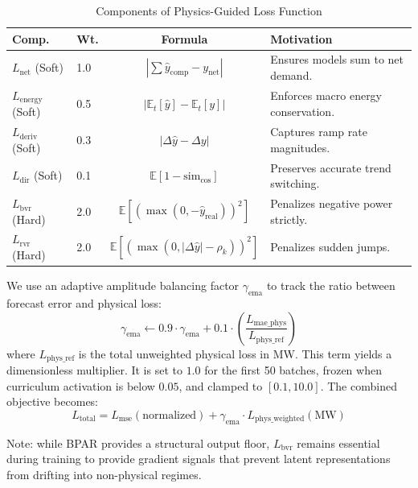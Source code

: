 \begin{table}[htbp]
\caption{Components of Physics-Guided Loss Function}
\label{tab:losses}
\centering
\footnotesize
\setlength{\tabcolsep}{3pt}
\begin{tabularx}{\columnwidth}{@{}llc>{\raggedright\arraybackslash}X@{}}
\toprule
\textbf{Comp.} & \textbf{Wt.} & \textbf{Formula} & \textbf{Motivation} \\ \midrule
$L_{\text{net}}$ (Soft) & 1.0 & $|\sum \hat{y}_{\text{comp}} - y_{\text{net}}|$ & Ensures models sum to net demand. \\
$L_{\text{energy}}$ (Soft) & 0.5 & $|\mathbb{E}_t[\hat{y}] - \mathbb{E}_t[y]|$ & Enforces macro energy conservation. \\
$L_{\text{deriv}}$ (Soft) & 0.3 & $|\Delta \hat{y} - \Delta y|$ & Captures ramp rate magnitudes. \\
$L_{\text{dir}}$ (Soft) & 0.1 & $\mathbb{E} [1 {-} \text{sim}_{\text{cos}}]$ & Preserves accurate trend switching. \\ \midrule
$L_{\text{bvr}}$ (Hard) & 2.0 & $\mathbb{E} [(\max(0, -\hat{y}_{\text{real}}))^2]$ & Penalizes negative power strictly. \\
$L_{\text{rvr}}$ (Hard) & 2.0 & $\mathbb{E} [(\max(0, |\Delta\hat{y}| {-} \rho_k))^2]$ & Penalizes sudden jumps. \\ \bottomrule
\end{tabularx}
\end{table}

We use an adaptive amplitude balancing factor $\gamma_{\text{ema}}$ to track the ratio between forecast error and physical loss:
\begin{equation}
    \gamma_{\text{ema}} \leftarrow 0.9 \cdot \gamma_{\text{ema}} + 0.1 \cdot \left( \frac{L_{\text{mae\_phys}}}{L_{\text{phys\_ref}}} \right)
\label{eq:gamma_ema}
\end{equation}
where $L_{\text{phys\_ref}}$ is the total unweighted physical loss in MW. This term yields a dimensionless multiplier. It is set to $1.0$ for the first 50 batches, frozen when curriculum activation is below $0.05$, and clamped to $[0.1, 10.0]$. The combined objective becomes:
\begin{equation}
    L_{\text{total}} = L_{\text{mse}}(\text{normalized}) + \gamma_{\text{ema}} \cdot L_{\text{phys\_weighted}}(\text{MW})
\label{eq:total_loss}
\end{equation}

Note: while BPAR provides a structural output floor, $L_{\text{bvr}}$ remains essential during training to provide gradient signals that prevent latent representations from drifting into non-physical regimes.


